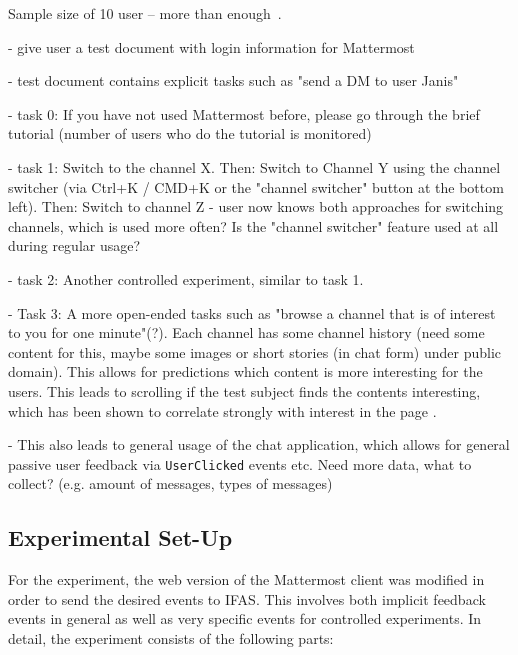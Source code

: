 Sample size of 10 user -- more than enough~\cite{Turner2006}.

- give user a test document with login information for Mattermost

- test document contains explicit tasks such as "send a DM to user Janis"

- task 0: If you have not used Mattermost before, please go through the brief tutorial (number of users who do the tutorial is monitored)

- task 1: Switch to the channel X. Then: Switch to Channel Y using the channel switcher (via Ctrl+K / CMD+K or the "channel switcher" button at the bottom left). Then: Switch to channel Z - user now knows both approaches for switching channels, which is used more often? Is the "channel switcher" feature used at all during regular usage?

- task 2: Another controlled experiment, similar to task 1.

- Task 3: A more open-ended tasks such as "browse a channel that is of interest to you for one minute"(?).
Each channel has some channel history (need some content for this, maybe some images or short stories (in chat form) under public domain).
This allows for predictions which content is more interesting for the users.
This leads to scrolling if the test subject finds the contents interesting, which has been shown to correlate strongly with interest in the page \cite{Claypool2001}.

- This also leads to general usage of the chat application, which allows for general passive user feedback via \texttt{UserClicked} events etc.
Need more data, what to collect? (e.g. amount of messages, types of messages)

%

\subsection{Experimental Set-Up}

For the experiment, the web version of the Mattermost client was modified in order to send the desired events to \ac{IFAS}.
This involves both implicit feedback events in general as well as very specific events for controlled experiments.
In detail, the experiment consists of the following parts:

